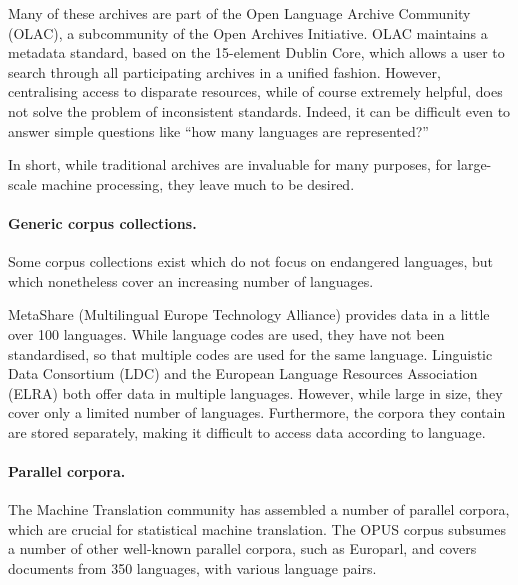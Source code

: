 Many of these archives are part of the Open Language Archive Community (OLAC), a subcommunity of the Open Archives Initiative.  OLAC maintains a metadata standard, based on the 15-element Dublin Core, which allows a user to search through all participating archives in a unified fashion.  However, centralising access to disparate resources, while of course extremely helpful, does not solve the problem of inconsistent standards.  Indeed, it can be difficult even to answer simple questions like ``how many languages are represented?''

In short, while traditional archives are invaluable for many purposes, for large-scale machine processing, they leave much to be desired.


\paragraph{Generic corpus collections.}
Some corpus collections exist which do not focus on endangered languages, but which nonetheless cover an increasing number of languages.

MetaShare (Multilingual Europe Technology Alliance) provides data in a little over 100 languages. While language codes are used, they have not been standardised, so that multiple codes are used for the same language.  Linguistic Data Consortium (LDC) and the European Language Resources Association (ELRA) both offer data in multiple languages.  However, while large in size, they cover only a limited number of languages.  Furthermore, the corpora they contain are stored separately, making it difficult to access data according to language.


\paragraph{Parallel corpora.}

The Machine Translation community has assembled a number of parallel corpora, which are crucial for statistical machine translation. The OPUS corpus \cite{tiedemann2012opus} subsumes a number of other well-known parallel corpora, such as Europarl, and covers documents from 350 languages, with various language pairs.  


